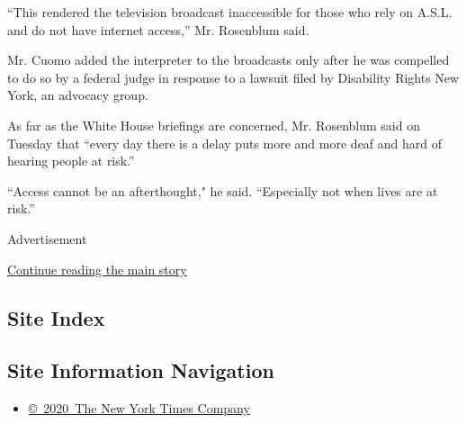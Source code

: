 ``This rendered the television broadcast inaccessible for those who rely
on A.S.L. and do not have internet access,'' Mr. Rosenblum said.

Mr. Cuomo added the interpreter to the broadcasts only after he was
compelled to do so by a federal judge in response to a lawsuit filed by
Disability Rights New York, an advocacy group.

As far as the White House briefings are concerned, Mr. Rosenblum said on
Tuesday that ``every day there is a delay puts more and more deaf and
hard of hearing people at risk.''

``Access cannot be an afterthought," he said. ``Especially not when
lives are at risk.''

Advertisement

\protect\hyperlink{after-bottom}{Continue reading the main story}

\hypertarget{site-index}{%
\subsection{Site Index}\label{site-index}}

\hypertarget{site-information-navigation}{%
\subsection{Site Information
Navigation}\label{site-information-navigation}}

\begin{itemize}
\tightlist
\item
  \href{https://help.nytimes3xbfgragh.onion/hc/en-us/articles/115014792127-Copyright-notice}{©~2020~The
  New York Times Company}
\end{itemize}

